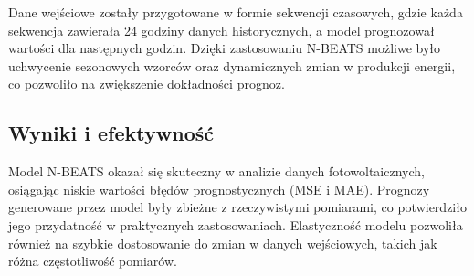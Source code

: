 \documentclass[a4paper,fleqn,final]{cas-dc}\usepackage[authoryear,longnamesfirst]{natbib}
\begin{document}
Dane wejściowe zostały przygotowane w formie sekwencji czasowych, gdzie każda sekwencja zawierała 24 godziny danych historycznych, a model prognozował wartości dla następnych godzin. Dzięki zastosowaniu N-BEATS możliwe było uchwycenie sezonowych wzorców oraz dynamicznych zmian w produkcji energii, co pozwoliło na zwiększenie dokładności prognoz.

\subsection{Wyniki i efektywność}
Model N-BEATS okazał się skuteczny w analizie danych fotowoltaicznych, osiągając niskie wartości błędów prognostycznych (MSE i MAE). Prognozy generowane przez model były zbieżne z rzeczywistymi pomiarami, co potwierdziło jego przydatność w praktycznych zastosowaniach. Elastyczność modelu pozwoliła również na szybkie dostosowanie do zmian w danych wejściowych, takich jak różna częstotliwość pomiarów.


\end{document}
